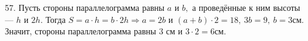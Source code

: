 57. Пусть стороны параллелограмма равны $a$ и $b,$ а проведённые к ним высоты --- $h$ и $2h.$ Тогда $S=a\cdot h=b\cdot 2h\Rightarrow a=2b$ и $(a+b)\cdot2=18,\ 3b=9,\ b=3$см. Значит, стороны параллелограмма равны 3 см и $3\cdot2=6$см.\\
